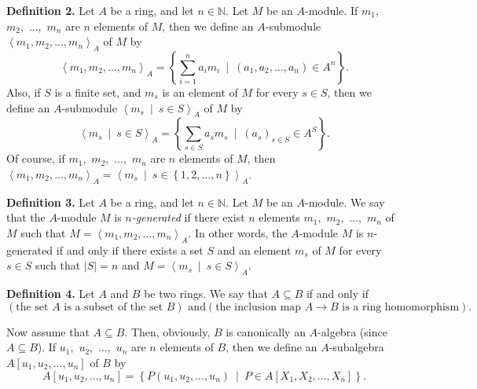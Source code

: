 \documentclass[12pt,final,notitlepage,onecolumn]{article}%
\begin{document}
\textbf{Definition 2.} Let $A$ be a ring, and let $n\in\mathbb{N}$. Let $M$ be
an $A$-module. If $m_{1},$ $m_{2},$ $...,$ $m_{n}$ are $n$ elements of $M$,
then we define an $A$-submodule $\left\langle m_{1},m_{2},...,m_{n}%
\right\rangle _{A}$ of $M$ by%
\[
\left\langle m_{1},m_{2},...,m_{n}\right\rangle _{A}=\left\{  \sum
\limits_{i=1}^{n}a_{i}m_{i}\ \mid\ \left(  a_{1},a_{2},...,a_{n}\right)  \in
A^{n}\right\}  .
\]
Also, if $S$ is a finite set, and $m_{s}$ is an element of $M$ for every $s\in
S$, then we define an $A$-submodule $\left\langle m_{s}\ \mid\ s\in
S\right\rangle _{A}$ of $M$ by%
\[
\left\langle m_{s}\ \mid\ s\in S\right\rangle _{A}=\left\{  \sum\limits_{s\in
S}a_{s}m_{s}\ \mid\ \left(  a_{s}\right)  _{s\in S}\in A^{S}\right\}  .
\]
Of course, if $m_{1},$ $m_{2},$ $...,$ $m_{n}$ are $n$ elements of $M$, then
$\left\langle m_{1},m_{2},...,m_{n}\right\rangle _{A}=\left\langle m_{s}%
\ \mid\ s\in\left\{  1,2,...,n\right\}  \right\rangle _{A}$.

\textbf{Definition 3.} Let $A$ be a ring, and let $n\in\mathbb{N}$. Let $M$ be
an $A$-module. We say that the $A$-module $M$ is $n$\textit{-generated} if
there exist $n$ elements $m_{1},$ $m_{2},$ $...,$ $m_{n}$ of $M$ such that
$M=\left\langle m_{1},m_{2},...,m_{n}\right\rangle _{A}$. In other words, the
$A$-module $M$ is $n$-generated if and only if there exists a set $S$ and an
element $m_{s}$ of $M$ for every $s\in S$ such that $\left\vert S\right\vert
=n$ and $M=\left\langle m_{s}\ \mid\ s\in S\right\rangle _{A}$.

\textbf{Definition 4.} Let $A$ and $B$ be two rings. We say that $A\subseteq
B$ if and only if
\[
\left(  \text{the set }A\text{ is a subset of the set }B\right)  \text{ and
}\left(  \text{the inclusion map }A\rightarrow B\text{ is a ring
homomorphism}\right)  .
\]


Now assume that $A\subseteq B$. Then, obviously, $B$ is canonically an
$A$-algebra (since $A\subseteq B$). If $u_{1},$ $u_{2},$ $...,$ $u_{n}$ are
$n$ elements of $B$, then we define an $A$-subalgebra $A\left[  u_{1}%
,u_{2},...,u_{n}\right]  $ of $B$ by%
\[
A\left[  u_{1},u_{2},...,u_{n}\right]  =\left\{  P\left(  u_{1},u_{2}%
,...,u_{n}\right)  \ \mid\ P\in A\left[  X_{1},X_{2},...,X_{n}\right]
\right\}  .
\]
\end{document}
